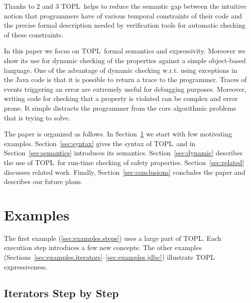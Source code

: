 \documentclass[preprint]{sigplanconf} %
\newcommand{\TPL}{TOPL}
\newcommand{\note}[2]{\textcolor{gray}{[\textcolor{red}{#1}: #2]}}
\newcommand{\rg}[1]{\note{rg}{#1}}
\theoremstyle{definition}
\theoremstyle{remark}
\begin{document}
Thanks to 2 and 3 \TPL \ helps to reduce the semantic gap between the intuitive notion that programmers have of various temporal constraints of their code and the precise formal description needed by verification tools for automatic 
checking of these constraints.

In this paper we focus on \TPL \ formal semantics and expressivity.
Moreover we show its use for dynamic checking of the properties against  a simple object-based language.
One of the advantage of dynamic checking w.r.t. using exceptions in the Java code is that it is possible to return a trace to the programmer.
Traces of events triggering an error are extremely useful for debugging purposes.
Moreover, writing code for checking that a property is violated can be complex and error prone. It simple distracts the programmer from the core algorithmic problems that is trying to solve.


The paper is organized as follows. In Section~\ref{sec:examples} we start with few motivating examples.
Section~\ref{sec:syntax} gives the syntax of \TPL \ and in Section~\ref{sec:semantics} introduces its semantics.
Section~\ref{sec:dynamic} describes the use of \TPL \ for run-time checking of safety properties.
Section~\ref{sec:related} discusses related work.
Finally, Section~\ref{sec:conclusions} concludes the paper
and describes our future plans.

\section{Examples} \label{sec:examples} %

The first example (\autoref{sec:examples.steps}) uses a large part of \TPL\null.
Each execution step introduces a few new concepts.
The other examples (Sections~\ref*{sec:examples.iterators}--\ref*{sec:examples.jdbc}) illustrate TOPL expressiveness.

\subsection{Iterators Step by Step} \label{sec:examples.steps} %
\end{document}
